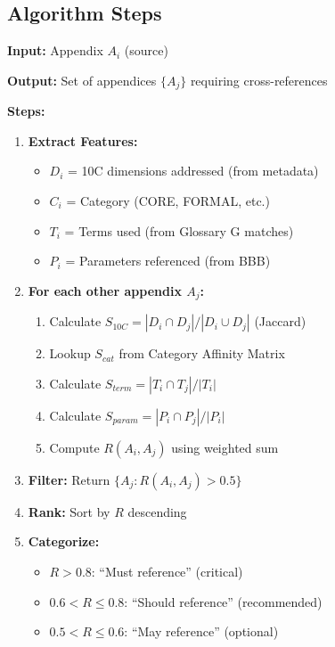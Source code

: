 \subsection{Algorithm Steps}

\begin{tcolorbox}[colback=green!5!white, colframe=green!75!black,
    title=CRIA Algorithm]

\textbf{Input:} Appendix $A_i$ (source)

\textbf{Output:} Set of appendices $\{A_j\}$ requiring cross-references

\textbf{Steps:}

\begin{enumerate}
\item \textbf{Extract Features:}
   \begin{itemize}[nosep]
   \item $D_i$ = 10C dimensions addressed (from metadata)
   \item $C_i$ = Category (CORE, FORMAL, etc.)
   \item $T_i$ = Terms used (from Glossary G matches)
   \item $P_i$ = Parameters referenced (from BBB)
   \end{itemize}

\item \textbf{For each other appendix $A_j$:}
   \begin{enumerate}
   \item Calculate $S_{10C} = |D_i \cap D_j| / |D_i \cup D_j|$ (Jaccard)
   \item Lookup $S_{cat}$ from Category Affinity Matrix
   \item Calculate $S_{term} = |T_i \cap T_j| / |T_i|$
   \item Calculate $S_{param} = |P_i \cap P_j| / |P_i|$
   \item Compute $R(A_i, A_j)$ using weighted sum
   \end{enumerate}

\item \textbf{Filter:} Return $\{A_j : R(A_i, A_j) > 0.5\}$

\item \textbf{Rank:} Sort by $R$ descending

\item \textbf{Categorize:}
   \begin{itemize}[nosep]
   \item $R > 0.8$: ``Must reference'' (critical)
   \item $0.6 < R \leq 0.8$: ``Should reference'' (recommended)
   \item $0.5 < R \leq 0.6$: ``May reference'' (optional)
   \end{itemize}
\end{enumerate}

\end{tcolorbox}


